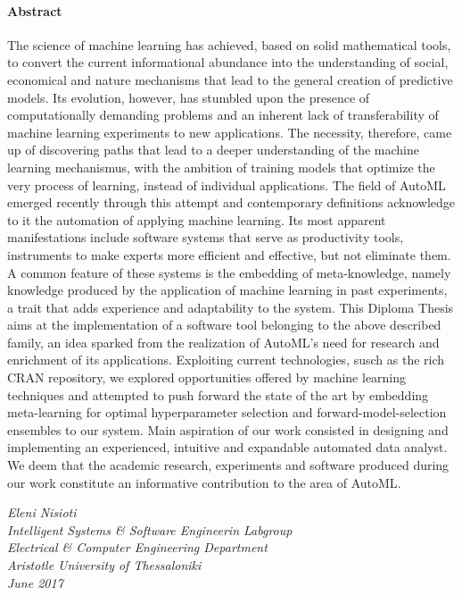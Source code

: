 {	\paragraph{Abstract}
	The science of machine learning has achieved, based on solid mathematical tools, to convert the current informational abundance into the under\-standing of social, economical and nature mechanisms that lead to the general creation of predictive models. Its evolution, however, has stumbled upon  the presence of computationally demanding problems and an inherent lack of transferability of machine learning experiments to new applications. The necessity, therefore, came up of discovering paths that lead to a deeper understanding of the machine learning mecha\-nismus, with the ambition of training models that optimize the very process of learning, instead of individual applications. The field of \gls{AutoML} emerged recently through this attempt and contempo\-rary definitions acknowledge to it the automation of applying machine learning. Its most apparent manifestations  include software systems that serve as productivity tools, instruments to make experts more efficient and effective, but not eliminate them. A common feature of these systems is the embedding of meta-knowledge, namely knowledge produced by the application of machine learning in past experi\-ments, a trait that adds experience and adaptability to the system. This Diploma Thesis aims at the implementation of a software tool belonging to the above described family, an idea sparked from the realization of \gls{AutoML}'s need for research and enrichment of its applications. Exploiting current technologies, susch as the rich CRAN repository, we explored opportunities offered by machine learning techniques and attempted to push forward the state of the art by embedding meta-learning for optimal hyperparameter selection and forward-model-selection ensembles to our system. Main aspiration of our work consisted in designing and implementing an experien\-ced, intuitive and expandable automated data analyst. We deem that the acade\-mic research, experiments and software produced during our work constitute an informa\-tive contribu\-tion to the area of \gls{AutoML}.       
	
	\vspace{2cm}
	
	\begin{flushleft}
		\textit{Eleni Nisioti \\
		Intelligent Systems \& Software Engineerin Labgroup\\
		Electrical \& Computer Engineering Department\\
		Aristotle University of Thessaloniki\\
		June 2017}
	\end{flushleft}
	
}
